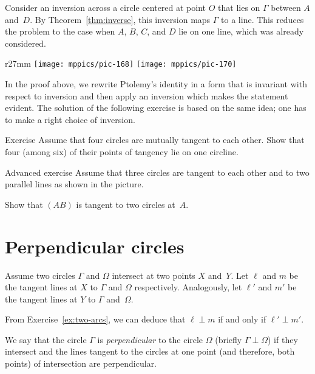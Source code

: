 Consider an inversion across a circle centered at point $O$ that lies on $\Gamma$ between $A$ and~$D$.
By 
Theorem~\ref{thm:inverse},
this inversion maps $\Gamma$ to a line.
This reduces the problem to the case when $A$, $B$, $C$, and $D$ lie on one line, which was already considered.
\qeds

{

\begin{wrapfigure}{r}{27mm}
\vskip-4mm
\centering
\texttt{[image: mppics/pic-168]}
\vskip4mm
\texttt{[image: mppics/pic-170]}
\end{wrapfigure}


In the proof above, we rewrite Ptolemy's identity in a form that is invariant with respect to inversion 
and then apply an inversion which makes the statement evident.
The solution of the following exercise is based on the same idea;
one has to make a right choice of inversion.



\begin{thm}{Exercise}\label{ex:4-circles}
Assume that four circles are mutually tangent to each other.
Show that four (among six) of their points of tangency lie on one circline.
\end{thm}


\begin{thm}{Advanced exercise}\label{ex:inverse}
Assume that three circles are tangent to each other and to two parallel lines as shown in the picture.

Show that $(AB)$ is tangent to two circles at~$A$.
\end{thm}

}

\section{Perpendicular circles}

Assume two circles $\Gamma$ and $\Omega$ intersect at two points $X$ and~$Y$.
Let $\ell$ and $m$ be the tangent lines at $X$ to $\Gamma$ and $\Omega$ respectively.
Analogously, let $\ell'$ and $m'$ be the tangent lines at $Y$ to $\Gamma$ and~$\Omega$.

From Exercise~\ref{ex:two-arcs}, we can deduce that  
 $\ell\perp m$ if and only if $\ell'\perp m'$.

We say that the circle $\Gamma$ is {}\emph{perpendicular} to the circle $\Omega$ 
(briefly $\Gamma\perp \Omega$)
if they intersect and the lines tangent to the circles at one point 
(and therefore, both points) 
of intersection are perpendicular.

